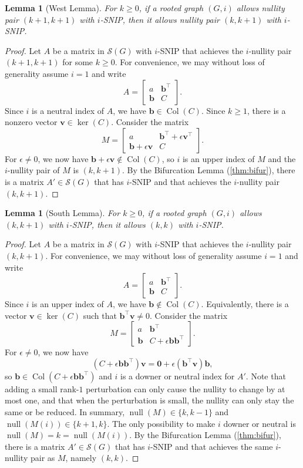 \documentclass{article}
\newtheorem{lemma}[theorem]{Lemma}
\theoremstyle{definition}
\newcommand{\trans}{^\top}
\newcommand{\bzero}{\mathbf{0}}
\newcommand{\bb}{\mathbf{b}}
\newcommand{\bv}{\mathbf{v}}
\newcommand{\nul}{\operatorname{null}}
\newcommand{\Col}{\operatorname{Col}}
\newcommand{\mptn}{\mathcal{S}} %
\begin{document}
\begin{lemma}[West Lemma]
\label{lem:west}
For $k \geq 0$, if a rooted graph $(G,i)$ allows nullity pair $(k+1,k+1)$ with $i$-SNIP, then it allows nullity pair $(k,k+1)$ with $i$-SNIP. 
\end{lemma}
\begin{proof}
Let $A$ be a matrix in $\mptn(G)$ with $i$-SNIP that achieves the $i$-nullity pair $(k+1,k+1)$ for some $k \geq 0$.
For convenience, we may without loss of generality assume $i = 1$ and write  
\[
    A = \begin{bmatrix} a & \bb\trans \\
    \bb & C
    \end{bmatrix}.   
\]
Since $i$ is a neutral index of $A$, we have $\bb\in\Col(C)$.  Since $k\geq 1$, there is a nonzero vector $\bv\in\ker(C)$.  Consider the matrix 
\[
    M = \begin{bmatrix} a & \bb\trans + \epsilon\bv\trans \\
    \bb + \epsilon\bv & C 
    \end{bmatrix}.   
\]
For $\epsilon\neq 0$, we now have $\bb + \epsilon\bv\notin\Col(C)$, so $i$ is an upper index of $M$ and the $i$-nullity pair of $M$ is $(k,k+1)$. 
 By the Bifurcation Lemma (\cref{thm:bifur}), there is a matrix $A'\in\mptn(G)$ that has $i$-SNIP and that achieves the $i$-nullity pair $(k,k+1)$.  
\end{proof}

\begin{lemma}[South Lemma]
\label{lem:south}
For $k \geq 0$, if a rooted graph $(G,i)$ allows $(k,k+1)$ with $i$-SNIP, then it allows $(k,k)$ with $i$-SNIP.
\end{lemma}
\begin{proof}
Let $A$ be a matrix in $\mptn(G)$ with $i$-SNIP that achieves the $i$-nullity pair $(k,k+1)$.  For convenience, we may without loss of generality assume $i = 1$ and write  
\[
    A = \begin{bmatrix} a & \bb\trans \\
    \bb & C
    \end{bmatrix}.   
\]
Since $i$ is an upper index of $A$, we have $\bb\notin\Col(C)$.  Equivalently, there is a vector $\bv\in\ker(C)$ such that $\bb\trans\bv\neq 0$.  Consider the matrix 
\[
    M = \begin{bmatrix} a & \bb\trans \\
    \bb & C + \epsilon\bb\bb\trans
    \end{bmatrix}.   
\]
For $\epsilon\neq 0$, we now have 
\[
    (C + \epsilon\bb\bb\trans)\bv = \bzero + \epsilon(\bb\trans\bv)\bb,
\]
so $\bb\in\Col(C + \epsilon\bb\bb\trans)$ and $i$ is a downer or neutral index for $A'$.  Note that adding a small rank-$1$ perturbation can only cause the nullity to change by at most one, and that when the perturbation is small, the nullity can only stay the same or be reduced.  In summary, $\nul(M) \in \{ k, k-1\}$ and $\nul(M(i)) \in \{ k+1, k\}$.  The only possibility to make $i$ downer or neutral is $\nul(M) = k = \nul(M(i))$.  By the Bifurcation Lemma (\cref{thm:bifur}), there is a matrix $A'\in\mptn(G)$ that has $i$-SNIP and that achieves the same $i$-nullity pair as $M$, namely $(k,k)$.  
\end{proof}
\end{document}
